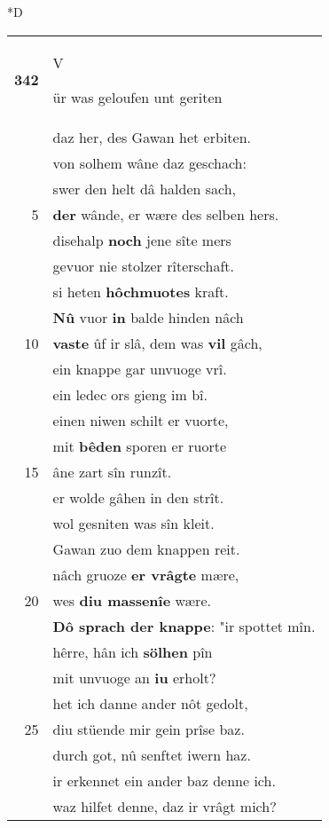 \documentclass[8pt,a4paper,notitlepage]{article}
\begin{document}
\begin{table}[ht]
\begin{minipage}[t]{0.5\linewidth}
\small
\begin{center}*D
\end{center}
\begin{tabular}{rl}
\textbf{342} & \begin{large}V\end{large}ür was geloufen unt geriten\\ 
 & daz her, des Gawan het erbiten.\\ 
 & von solhem wâne daz geschach:\\ 
 & swer den helt dâ halden sach,\\ 
5 & \textbf{der} wânde, er wære des selben hers.\\ 
 & disehalp \textbf{noch} jene sîte mers\\ 
 & gevuor nie stolzer rîterschaft.\\ 
 & si heten \textbf{hôchmuotes} kraft.\\ 
 & \textbf{Nû} vuor \textbf{in} balde hinden nâch\\ 
10 & \textbf{vaste} ûf ir slâ, dem was \textbf{vil} gâch,\\ 
 & ein knappe gar unvuoge vrî.\\ 
 & ein ledec ors gieng im bî.\\ 
 & einen niwen schilt er vuorte,\\ 
 & mit \textbf{bêden} sporen er ruorte\\ 
15 & âne zart sîn runzît.\\ 
 & er wolde gâhen in den strît.\\ 
 & wol gesniten was sîn kleit.\\ 
 & Gawan zuo dem knappen reit.\\ 
 & nâch gruoze \textbf{er vrâgte} mære,\\ 
20 & wes \textbf{diu massenîe} wære.\\ 
 & \textbf{Dô sprach der knappe}: "ir spottet mîn.\\ 
 & hêrre, hân ich \textbf{sölhen} pîn\\ 
 & mit unvuoge an \textbf{iu} erholt?\\ 
 & het ich danne ander nôt gedolt,\\ 
25 & diu stüende mir gein prîse baz.\\ 
 & durch got, nû senftet iwern haz.\\ 
 & ir erkennet ein ander baz denne ich.\\ 
 & waz hilfet denne, daz ir vrâgt mich?\\ 

\end{tabular}
\end{minipage}
\end{table}
\end{document}
